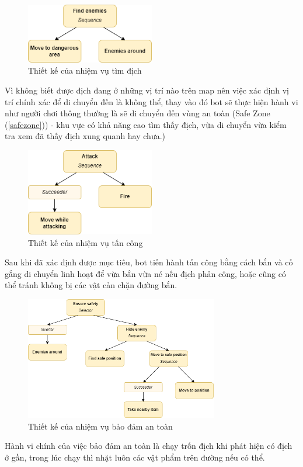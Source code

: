 \documentclass[12pt,a4paper]{article}
\begin{document}
  \begin{figure}[H]
      \centering
      \includegraphics[width=0.5\textwidth]{Img/AI/find-enemies.png}
      \caption{Thiết kế của nhiệm vụ tìm địch}
  \end{figure}
  Vì không biết được địch đang ở những vị trí nào trên map nên việc xác định vị trí chính xác để di chuyển đến là không thể, thay vào đó bot sẽ thực hiện hành vi như người chơi thông thường là sẽ di chuyển đến vùng an toàn (Safe Zone (\ref{safezone})) - khu vực có khả năng cao tìm thấy địch, vừa di chuyển vừa kiểm tra xem đã thấy địch xung quanh hay chưa.)

  \begin{figure}[H]
      \centering
      \includegraphics[width=0.5\textwidth]{Img/AI/attack.png}
      \caption{Thiết kế của nhiệm vụ tấn công}
  \end{figure}
  Sau khi đã xác định được mục tiêu, bot tiến hành tấn công bằng cách bắn và cố gắng di chuyển linh hoạt để vừa bắn vừa né nếu địch phản công, hoặc cũng có thể tránh không bị các vật cản chặn đường bắn.

  \begin{figure}[H]
      \centering
      \includegraphics[width=0.75\textwidth]{Img/AI/ensure-safety.png}
      \caption{Thiết kế của nhiệm vụ bảo đảm an toàn}
  \end{figure}
  Hành vi chính của việc bảo đảm an toàn là chạy trốn địch khi phát hiện có địch ở gần, trong lúc chạy thì nhặt luôn các vật phẩm trên đường nếu có thể.
\end{document}
